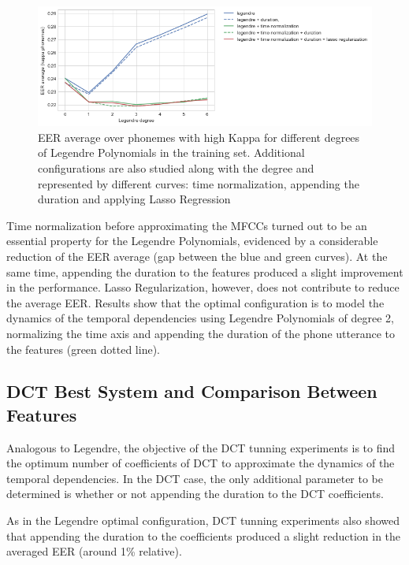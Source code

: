 \begin{figure}[H]
	\centering
	\includegraphics[width=1.0\textwidth]{files/figures/results/legendre-dct/legendre-tunning.png}
	\caption{EER average over phonemes with high Kappa for different
	degrees of Legendre Polynomials in
	the training set. Additional configurations are also studied along with the degree and
	represented by different curves: time normalization, appending the duration and applying
	Lasso Regression}
	\label{fig:legendreTunning}
\end{figure}

Time normalization before approximating the
MFCCs turned out to be an essential property for the Legendre Polynomials, evidenced by a
considerable reduction of the EER average (gap between the blue and green curves). At the same
time, appending the duration to the features produced a slight improvement in the performance.
Lasso Regularization, however, does not contribute to reduce the average EER.
Results show that the optimal configuration is to model the dynamics of the temporal dependencies
using Legendre Polynomials of degree 2, normalizing the time axis and appending the duration of the
phone utterance to the features (green dotted line).

\subsection{DCT Best System and Comparison Between Features}

Analogous to Legendre, the objective of the DCT tunning experiments is to find the optimum
number of coefficients of DCT to approximate the dynamics of the temporal dependencies.
In the DCT case, the only additional parameter to be determined is whether or not appending the
duration to the DCT coefficients.

As in the Legendre optimal configuration, DCT tunning experiments also showed that appending the
duration to the coefficients produced a slight reduction in the averaged EER (around 1\%
relative).


